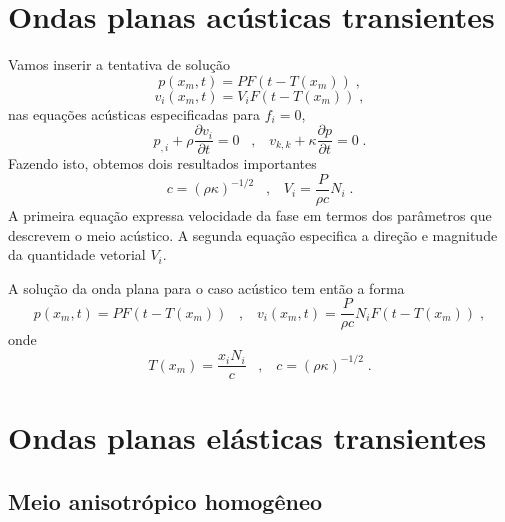 \section{Ondas planas ac\'usticas transientes}

Vamos inserir a tentativa de solu\c{c}\~ao
\begin{equation}
p(x_m,t)=PF(t-T(x_m)) \;,
\end{equation}
\begin{equation}
v_i(x_m,t)=V_iF(t-T(x_m)) \;,
\end{equation}
nas equa\c{c}\~oes ac\'usticas especificadas para $f_i=0$,
\begin{equation}
p_{,i}+\rho\frac{\partial v_i}{\partial t}=0 \;\;\;,\;\;\;
v_{k,k}+\kappa\frac{\partial p}{\partial t}=0 \;.
\end{equation}
Fazendo isto, obtemos dois resultados importantes
\begin{equation}
c=(\rho \kappa)^{-1/2} \;\;\;,\;\;\; V_i=\frac{P}{\rho c}N_i \;.
\end{equation}
A primeira equa\c{c}\~ao expressa velocidade da fase em termos dos
par\^ametros que descrevem o meio ac\'ustico. A segunda
equa\c{c}\~ao especifica a dire\c{c}\~ao e magnitude da quantidade
vetorial $V_i$.

A solu\c{c}\~ao da onda plana para o caso ac\'ustico tem ent\~ao a
forma
\begin{equation}
p(x_m,t)=PF(t-T(x_m)) \;\;\;,\;\;\; v_i(x_m,t)=\frac{P}{\rho c}N_i
F(t-T(x_m)) \;,
\end{equation}
onde
\begin{equation}
T(x_m)=\frac{x_i N_i}{c} \;\;\;,\;\;\; c=(\rho \kappa)^{-1/2} \;.
\end{equation}

\section{Ondas planas el\'asticas transientes}

\subsection{Meio anisotr\'opico homog\^eneo}

